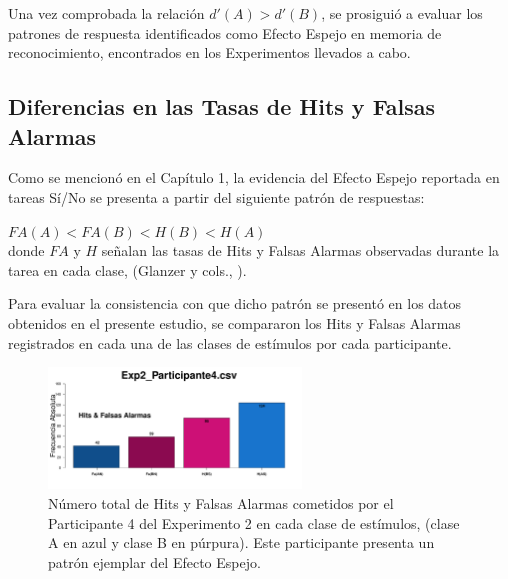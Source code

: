 Una vez comprobada la relación $d'(A) > d'(B)$, se prosiguió a evaluar los patrones de respuesta identificados como Efecto Espejo en memoria de reconocimiento, encontrados en los Experimentos llevados a cabo.












\subsection{Diferencias en las Tasas de Hits y Falsas Alarmas}

Como se mencionó en el Capítulo 1, la evidencia del Efecto Espejo reportada en tareas Sí/No se presenta a partir del siguiente patrón de respuestas:\\
 
\begin{center}
$FA(A) < FA(B) < H(B) < H(A)$\\
donde $FA$ y $H$ señalan las tasas de Hits y Falsas Alarmas observadas durante la tarea en cada clase, (Glanzer y cols., \citeyear{Glanzer1993}).\\
\end{center}

Para evaluar la consistencia con que dicho patrón se presentó en los datos obtenidos en el presente estudio, se compararon los Hits y Falsas Alarmas registrados en cada una de las clases de estímulos por cada participante.\\

\begin{figure}[h]
\centering
\includegraphics[width=0.60\textwidth]{Figures/MirrorRate_Exp2_P4}
\decoRule
\caption[Explorando datos individuales (ejemplo): Diferencias entre Hits y Falsas Alarmas registrados por clase de estímulo]{Número total de Hits y Falsas Alarmas cometidos por el Participante 4 del Experimento 2 en cada clase de estímulos, (clase A en azul y clase B en púrpura). Este participante presenta un patrón ejemplar del Efecto Espejo.}
\label{fig:MirrorRate_E2_P4}
\end{figure}

